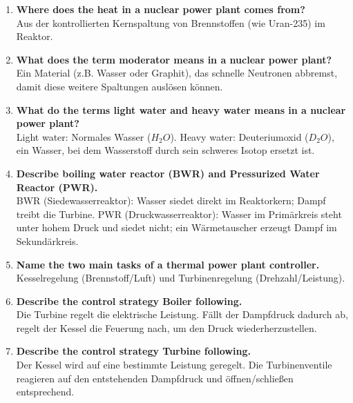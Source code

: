\documentclass{article}
\begin{document}
\begin{enumerate}
    \item \textbf{Where does the heat in a nuclear power plant comes from?} \\
    Aus der kontrollierten Kernspaltung von Brennstoffen (wie Uran-235) im Reaktor.
    \item \textbf{What does the term moderator means in a nuclear power plant?} \\
    Ein Material (z.B. Wasser oder Graphit), das schnelle Neutronen abbremst, damit diese weitere Spaltungen auslösen können.
    \item \textbf{What do the terms light water and heavy water means in a nuclear power plant?} \\
    Light water: Normales Wasser ($H_2O$). Heavy water: Deuteriumoxid ($D_2O$), ein Wasser, bei dem Wasserstoff durch sein schweres Isotop ersetzt ist.
    \item \textbf{Describe boiling water reactor (BWR) and Pressurized Water Reactor (PWR).} \\
    BWR (Siedewasserreaktor): Wasser siedet direkt im Reaktorkern; Dampf treibt die Turbine. PWR (Druckwasserreaktor): Wasser im Primärkreis steht unter hohem Druck und siedet nicht; ein Wärmetauscher erzeugt Dampf im Sekundärkreis.
    \item \textbf{Name the two main tasks of a thermal power plant controller.} \\
    Kesselregelung (Brennstoff/Luft) und Turbinenregelung (Drehzahl/Leistung).
    \item \textbf{Describe the control strategy Boiler following.} \\
    Die Turbine regelt die elektrische Leistung. Fällt der Dampfdruck dadurch ab, regelt der Kessel die Feuerung nach, um den Druck wiederherzustellen.
    \item \textbf{Describe the control strategy Turbine following.} \\
    Der Kessel wird auf eine bestimmte Leistung geregelt. Die Turbinenventile reagieren auf den entstehenden Dampfdruck und öffnen/schließen entsprechend.
\end{enumerate}
\end{document}
